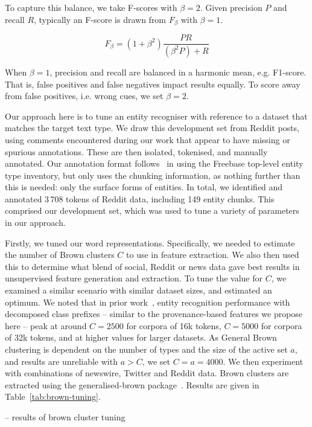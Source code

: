 \documentclass[journal,10pt,draftclsnofoot,onecolumn]{IEEEtran}
\begin{document}
To capture this balance, we take F-scores with $\beta=2$.
Given precision $P$ and recall $R$, typically an F-score is drawn from $F_\beta$ with $\beta=1$.

\begin{equation}
F_\beta = (1+\beta^2)\frac{PR}{(\beta^2 P) + R} 
\end{equation}

When $\beta=1$, precision and recall are balanced in a harmonic mean, e.g. F1-score.
That is, false positives and false negatives impact results equally.
To score away from false positives, i.e. wrong cues, we set $\beta=2$.

Our approach here is to tune an entity recogniser with reference to a dataset that matches the target text type.
We draw this development set from Reddit posts, using comments encountered during our work that appear to have missing or spurious annotations.
These are then isolated, tokenised, and manually annotated.
Our annotation format follows~\cite{ritter2011named} in using the Freebase top-level entity type inventory, but only uses the chunking information, as nothing further than this is needed: only the surface forms of entities.
In total, we identified and annotated 3\,708 tokens of Reddit data, including 149 entity chunks.
This comprised our development set, which was used to tune a variety of parameters in our approach.

Firstly, we tuned our word representations.
Specifically, we needed to estimate the number of Brown clusters $C$ to use in feature extraction.
We also then used this to determine what blend of social, Reddit or news data gave best results in unsupervised feature generation and extraction.
To tune the value for $C$, we examined a similar scenario with similar dataset sizes, and estimated an optimum.
We noted that in prior work~\cite{derczynski2015tune}, entity recognition performance with decomposed class prefixes -- similar to the provenance-based features we propose here -- peak at around $C=2500$ for corpora of 16k tokens, $C=5000$ for corpora of 32k tokens, and at higher values for larger datasets.
As General Brown clustering is dependent on the number of types and the size of the active set $a$, and results are unreliable with $a>C$, we set $C = a = 4000$.
We then experiment with combinations of newswire, Twitter and Reddit data.
Brown clusters are extracted using the generalised-brown package~\cite{sean_chester_2015_33758}.
Results are given in Table~\ref{tab:brown-tuning}.

-- results of brown cluster tuning
\end{document}
